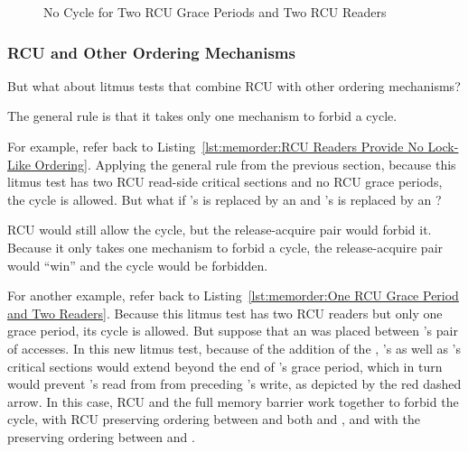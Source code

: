 \begin{figure}[tbp]
\centering
{}
\caption{No Cycle for Two RCU Grace Periods and Two RCU Readers}
\label{fig:memorder:No Cycle for Two RCU Grace Periods and Two RCU Readers}
\end{figure}

\subsubsection{RCU and Other Ordering Mechanisms}
\label{sec:memorder:RCU and Other Ordering Mechanisms}

But what about litmus tests that combine RCU with other ordering
mechanisms?

The general rule is that it takes only one mechanism to forbid a cycle.

For example, refer back to
Listing~\ref{lst:memorder:RCU Readers Provide No Lock-Like Ordering}.
Applying the general rule from the previous section, because this litmus
test has two RCU read-side critical sections and no RCU grace periods,
the cycle is allowed.
But what if 's  is replaced by an
 and 's  is replaced
by an ?

RCU would still allow the cycle, but the release-acquire pair would
forbid it.
Because it only takes one mechanism to forbid a cycle, the
release-acquire pair would ``win'' and the cycle would be
forbidden.

For another example, refer back to
Listing~\ref{lst:memorder:One RCU Grace Period and Two Readers}.
Because this litmus test has two RCU readers but only one grace period,
its cycle is allowed.
But suppose that an  was placed between 's
pair of accesses.
In this new litmus test, because of the addition of the ,
's as well as 's critical sections would extend beyond the
end of 's grace period, which in turn would prevent 's
read from  from preceding 's write, as depicted by the
red dashed arrow.
In this case, RCU and the full memory barrier work together to forbid
the cycle, with RCU preserving ordering between  and both
 and , and with the  preserving
ordering between  and .

